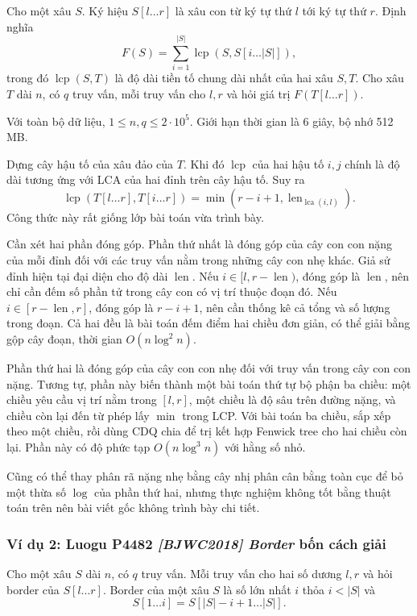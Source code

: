 \documentclass[11pt]{article}
\begin{document}
Cho một xâu \(S\). Ký hiệu \(S[l\ldots r]\) là xâu con từ ký tự thứ \(l\) tới
ký tự thứ \(r\). Định nghĩa
\[
  F(S)=\sum_{i=1}^{|S|}\operatorname{lcp}(S,S[i\ldots |S|]),
\]
trong đó \(\operatorname{lcp}(S,T)\) là độ dài tiền tố chung dài nhất của hai
xâu \(S,T\). Cho xâu \(T\) dài \(n\), có \(q\) truy vấn, mỗi truy vấn cho
\(l,r\) và hỏi giá trị \(F(T[l\ldots r])\).

Với toàn bộ dữ liệu, \(1\le n,q\le 2\cdot 10^5\). Giới hạn thời gian là
6 giây, bộ nhớ 512 MB.

Dựng cây hậu tố của xâu đảo của \(T\). Khi đó \(\operatorname{lcp}\) của hai
hậu tố \(i,j\) chính là độ dài tương ứng với LCA của hai đỉnh trên cây hậu tố.
Suy ra
\[
  \operatorname{lcp}(T[l\ldots r],T[i\ldots r])
  =
  \min(r-i+1,\operatorname{len}_{\operatorname{lca}(i,l)}).
\]
Công thức này rất giống lớp bài toán vừa trình bày.

Cần xét hai phần đóng góp. Phần thứ nhất là đóng góp của cây con con nặng của
mỗi đỉnh đối với các truy vấn nằm trong những cây con nhẹ khác. Giả sử đỉnh
hiện tại đại diện cho độ dài \(\operatorname{len}\). Nếu
\(i\in [l,r-\operatorname{len})\), đóng góp là \(\operatorname{len}\), nên chỉ
cần đếm số phần tử trong cây con có vị trí thuộc đoạn đó. Nếu
\(i\in [r-\operatorname{len},r]\), đóng góp là \(r-i+1\), nên cần thống kê cả
tổng và số lượng trong đoạn. Cả hai đều là bài toán đếm điểm hai chiều đơn
giản, có thể giải bằng gộp cây đoạn, thời gian \(O(n\log^2 n)\).

Phần thứ hai là đóng góp của cây con con nhẹ đối với truy vấn trong cây con con
nặng. Tương tự, phần này biến thành một bài toán thứ tự bộ phận ba chiều: một
chiều yêu cầu vị trí nằm trong \([l,r]\), một chiều là độ sâu trên đường nặng,
và chiều còn lại đến từ phép lấy \(\min\) trong LCP. Với bài toán ba chiều, sắp
xếp theo một chiều, rồi dùng CDQ chia để trị kết hợp Fenwick tree cho hai chiều
còn lại. Phần này có độ phức tạp \(O(n\log^3 n)\) với hằng số nhỏ.

Cũng có thể thay phân rã nặng nhẹ bằng cây nhị phân cân bằng toàn cục để bỏ một
thừa số \(\log\) của phần thứ hai, nhưng thực nghiệm không tốt bằng thuật toán
trên nên bài viết gốc không trình bày chi tiết.

\subsubsection{Ví dụ 2: Luogu P4482 \emph{[BJWC2018] Border} bốn cách giải}

Cho một xâu \(S\) dài \(n\), có \(q\) truy vấn. Mỗi truy vấn cho hai số dương
\(l,r\) và hỏi border của \(S[l\ldots r]\). Border của một xâu \(S\) là số
lớn nhất \(i\) thỏa \(i<|S|\) và
\[
  S[1\ldots i]=S[|S|-i+1\ldots |S|].
\]
\end{document}
